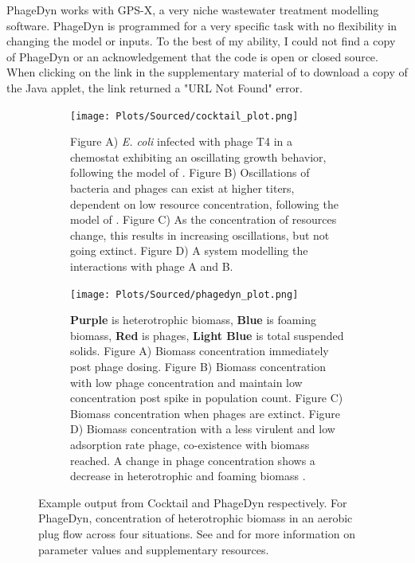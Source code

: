 PhageDyn works with GPS-X, a very niche wastewater treatment modelling software. 
PhageDyn is programmed for a very specific task with no flexibility in changing the model or inputs. 
To the best of my ability, I could not find a copy of PhageDyn or an acknowledgement that the code is open or closed source. 
When clicking on the link in the supplementary material of \citet{krysiak-baltynSimulationPhageDynamics2017} to download a copy of the Java applet, the link returned a "URL Not Found" error. 

\begin{figure}
    \centering
    \begin{subfigure}{0.49\linewidth}
        \centering
        \captionsetup{width=1\linewidth}
        \texttt{[image: Plots/Sourced/cocktail\_plot.png]}
        \caption{
            Figure A) \textit{E. coli} infected with phage T4 in a chemostat exhibiting an oscillating growth behavior, following the model of \citet{bohannanEffectResourceEnrichment1997}. 
            Figure B) Oscillations of bacteria and phages can exist at higher titers, dependent on low resource concentration, following the model of \citet{lenskiDynamicsInteractionsBacteria1988}. 
            Figure C) As the concentration of resources change, this results in increasing oscillations, but not going extinct. 
            Figure D) A system modelling the interactions with phage A and B. 
        }
        \label{fig:sourced:cocktail_plot}
    \end{subfigure}
    \hfill
    \begin{subfigure}{0.49\linewidth}
        \centering
        \captionsetup{width=1\linewidth}
        \texttt{[image: Plots/Sourced/phagedyn\_plot.png]}
        \caption{
            \textcolor[HTML]{551A8C}{\textbf{Purple}} is heterotrophic biomass, 
            \textcolor[HTML]{4580B4}{\textbf{Blue}} is foaming biomass, 
            \textcolor[HTML]{FF0000}{\textbf{Red}} is phages, 
            \textcolor[HTML]{01E6EE}{\textbf{Light Blue}} is total suspended solids. 
            Figure A) Biomass concentration immediately post phage dosing. 
            Figure B) Biomass concentration with low phage concentration and maintain low concentration post spike in population count. 
            Figure C) Biomass concentration when phages are extinct. 
            Figure D) Biomass concentration with a less virulent and low adsorption rate phage, co-existence with biomass reached. 
            A change in phage concentration shows a decrease in heterotrophic and foaming biomass \cite{krysiak-baltynSimulationPhageDynamics2017}. 
        }
        \label{fig:sourced:phagedyn_plot}
    \end{subfigure}
    \caption{Example output from Cocktail and PhageDyn respectively. For PhageDyn, concentration of heterotrophic biomass in an aerobic plug flow across four situations.
        See \citet{nilssonCocktailComputerProgram2022} and \citet{krysiak-baltynSimulationPhageDynamics2017} for more information on parameter values and supplementary resources. 
    }
    \label{fig:sourced:cocktail_and_phagedyn}
\end{figure}